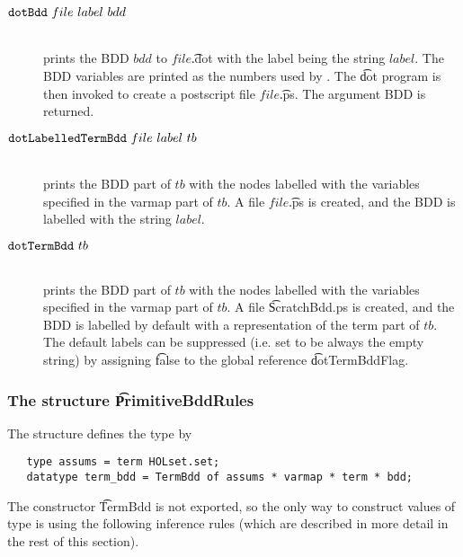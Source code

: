 \begin{description}
\item[$\mbox{\tt dotBdd}~file~label~bdd$]\mbox{}\\
prints the BDD $bdd$ to $file$\t{.dot} with
the label being the string $label$. The BDD variables are printed as the numbers used by \Buddy{}.
The \t{dot} program is then invoked to create 
a postscript file $file$\t{.ps}. The argument BDD is returned.

\item[$\mbox{\tt dotLabelledTermBdd}~file~label~tb$]\mbox{}\\
prints the
BDD part of \termbddty $tb$ with the nodes labelled with
the variables specified in the varmap part of $tb$. A file $file$\t{.ps}
is created, and the BDD is labelled with the string $label$.


\item[$\mbox{\tt dotTermBdd}~tb$]\mbox{}\\
prints the
BDD part of \termbddty $tb$ with the nodes labelled with
the variables specified in the varmap part of $tb$. A file \t{ScratchBdd.ps}
is created, and the BDD is labelled by default with a representation
of the term part of $tb$. The default labels
can be suppressed (i.e. set to be always the empty string) by assigning \t{false}
to the global reference \t{dotTermBddFlag}.
\end{description}

\subsubsection{The structure \t{PrimitiveBddRules}}\label{PrimitiveBddRules}

The structure  defines the type \termbddty{} by

\vspace*{-2mm}

\begin{verbatim}
   type assums = term HOLset.set;
   datatype term_bdd = TermBdd of assums * varmap * term * bdd;
\end{verbatim}

\vspace*{-2mm}

The constructor \t{TermBdd} is not exported, so the only way to construct
values of type \termbddty is using the following inference rules
(which are described in more detail in the rest of this section).

